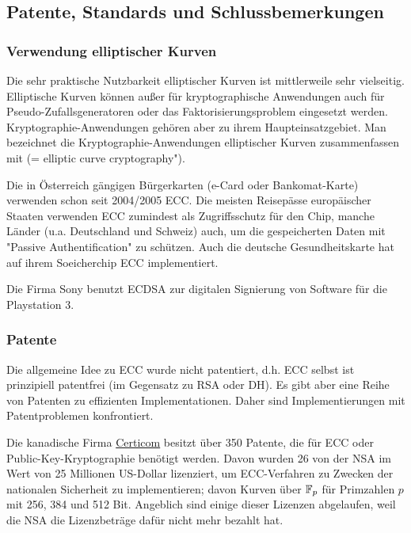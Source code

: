 \nextlecture
\newpage
\subsection{Patente, Standards und Schlussbemerkungen}
\label{sub:4.4}
\subsubsection{Verwendung elliptischer Kurven}
\label{subsub:4.4.1}
\begin{bem}
	Die sehr praktische Nutzbarkeit elliptischer Kurven ist mittlerweile sehr vielseitig. \marginnote{[21]}
	Elliptische Kurven können außer für kryptographische Anwendungen auch für Pseudo-Zufallsgeneratoren oder das Faktorisierungsproblem eingesetzt werden.
	Kryptographie-Anwendungen gehören aber zu ihrem Haupteinsatzgebiet.
	Man bezeichnet die Kryptographie-Anwendungen elliptischer Kurven zusammenfassen mit  (= elliptic curve cryptography").
\end{bem}

\begin{bem}
	Die in Österreich gängigen Bürgerkarten (e-Card oder Bankomat-Karte) verwenden schon seit 2004/2005 ECC.
	Die meisten Reisepässe europäischer Staaten verwenden ECC zumindest als Zugriffsschutz für den Chip, manche Länder (u.a. Deutschland und Schweiz) auch, um die gespeicherten Daten mit "Passive Authentification" zu schützen.
	Auch die deutsche Gesundheitskarte hat auf ihrem Soeicherchip ECC implementiert.
\end{bem}

\begin{bem}
	Die Firma Sony benutzt ECDSA zur digitalen Signierung von Software für die Playstation 3.
\end{bem}

\subsubsection{Patente}
\label{subsub:4.4.2}
\begin{bem}
	Die allgemeine Idee zu ECC wurde nicht patentiert, d.h. ECC selbst ist prinzipiell patentfrei (im Gegensatz zu RSA oder DH).
	Es gibt aber eine Reihe von Patenten zu effizienten Implementationen.
	Daher sind Implementierungen mit Patentproblemen konfrontiert.
\end{bem}

\begin{bem}
	Die kanadische Firma \href{http://www.certicom.com}{Certicom} besitzt über 350 Patente, die für ECC oder Public-Key-Kryptographie benötigt werden.
	Davon wurden 26 von der NSA im Wert von 25 Millionen US-Dollar lizenziert, um ECC-Verfahren zu Zwecken der nationalen Sicherheit zu implementieren; davon Kurven über $\mathbb{F}_p$ für Primzahlen $p$ mit 256, 384 und 512 Bit.
	Angeblich sind einige dieser Lizenzen abgelaufen, weil die NSA die Lizenzbeträge dafür nicht mehr bezahlt hat.
\end{bem}

